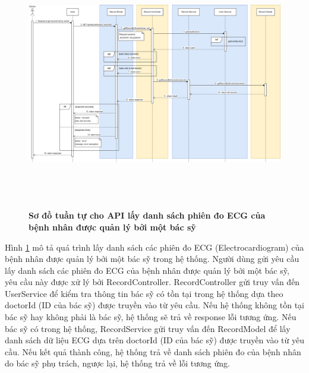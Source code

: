  \begin{figure}[H]
  \centering
  \includegraphics[width=16cm,height=11cm]{Images/sequence_api/getRecordsByDoctor.png}
  \caption[Sơ đồ tuần tự cho API lấy danh sách phiên đo ECG của bệnh nhân được quản lý bởi một bác sỹ ]{\bfseries \fontsize{12pt}{0pt}
  \selectfont Sơ đồ tuần tự cho API lấy danh sách phiên đo ECG của bệnh nhân được quản lý bởi một bác sỹ}
  \label{api_getRecordsByDoctor} %
\end{figure}
Hình \ref{api_getRecordsByDoctor} mô tả quá trình lấy danh sách các phiên đo ECG (Electrocardiogram) của bệnh nhân được quản lý bởi một bác sỹ trong hệ thống. Người dùng gửi yêu cầu lấy danh sách các phiên đo ECG của bệnh nhân được quản lý bởi một bác sỹ, 
yêu cầu này được xử lý bởi RecordController. RecordController gửi truy vấn đến UserService để kiểm tra thông tin bác sỹ có tồn tại trong hệ thống dựa theo doctorId (ID của bác sỹ) được truyền vào từ yêu cầu. Nếu hệ thống không tồn tại bác sỹ hay không phải là bác sỹ, hệ thống sẽ
trả về response lỗi tương ứng. Nếu bác sỹ có trong hệ thống, RecordService gửi truy vấn đến RecordModel để lấy danh sách dữ liệu ECG dựa trên doctorId (ID của bác sỹ) được truyền vào từ yêu cầu. 
Nếu kết quả thành công, hệ thống trả về danh sách phiên đo của bệnh nhân do bác sỹ phụ trách, ngược lại, hệ thống trả về lỗi tương ứng.

